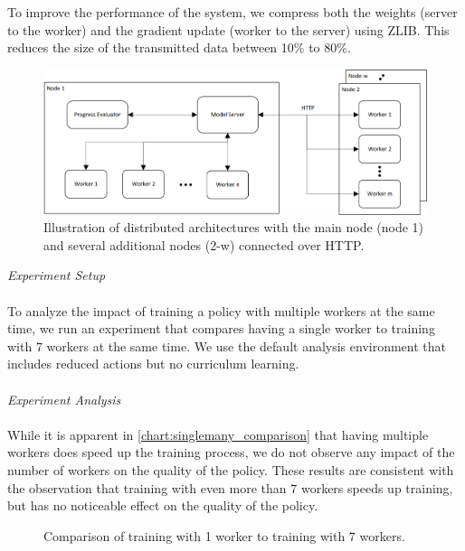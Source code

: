 To improve the performance of the system, we compress both the weights (server to the worker) and the gradient update (worker to the server) using ZLIB. This reduces the size of the transmitted data between 10\% to 80\%.
\begin{figure}[H]
	\centering
	\includegraphics[width=400pt]{images/visio/architecture.png}
	\caption{Illustration of distributed architectures with the main node (node 1) and several additional nodes (2-w) connected over HTTP.}
	\label{dist_architecture_img}
\end{figure}
\textit{Experiment Setup}\\\\
To analyze the impact of training a policy with multiple workers at the same time, we run an experiment that compares having a single worker to training with 7 workers at the same time. We use the default analysis environment that includes reduced actions but no curriculum learning.\\\\
\textit{Experiment Analysis}\\\\
While it is apparent in \autoref{chart:singlemany_comparison} that having multiple workers does speed up the training process, we do not observe any impact of the number of workers on the quality of the policy. These results are consistent with the observation that training with even more than 7 workers speeds up training, but has no noticeable effect on the quality of the policy.
\begin{figure}[H]
	\begin{center}
		
	\end{center}
	\caption{Comparison of training with 1 worker to training with 7 workers.}
	\label{chart:singlemany_comparison}
\end{figure}
